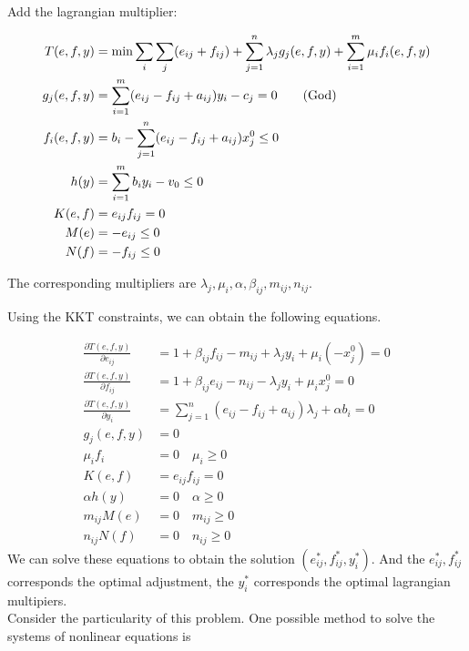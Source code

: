 \documentclass[UTF8]{article}
\begin{document}
Add the lagrangian multiplier:

\begin{align}
  T(e,f,y) &= \min \sum_i\sum_j(e_{ij}+f_{ij}) + \sum_{j=1}^n \lambda_j
  g_j(e,f,y) + \sum_{i=1}^m \mu_i f_i(e,f,y)\nonumber\\
  g_j(e,f,y) &= \sum_{i=1}^m (e_{ij}-f_{ij}+a_{ij})y_i-c_j = 0 \tag{\text{God}} \\
  f_i(e,f,y) &= b_i - \sum_{j=1}^n (e_{ij}-f_{ij}+a_{ij})x_j^0 \leq 0 \\
  h(y) &= \sum_{i=1}^m b_i y_i - v_0 \leq 0\\
  K(e,f) &= e_{ij}f_{ij}=0  \\
  M(e) &= -e_{ij} \leq 0 \label{M}  \\
  N(f) &= -f_{ij} \leq 0
\end{align}

The corresponding multipliers are $\lambda_j, \mu_i, \alpha, \beta_{ij}, m_{ij}, n_{ij}$.

Using the KKT constraints, we can obtain the following equations.

\begin{align*}
  \frac{\partial T(e,f,y)}{\partial e_{ij}} &= 1+ \beta_{ij} f_{ij} - m_{ij}+\lambda_j y_i + \mu_i(-x_j^0) = 0  \\
  \frac{\partial T(e,f,y)}{\partial f_{ij}} &= 1+ \beta_{ij} e_{ij} - n_{ij}-\lambda_j y_i + \mu_i x_j^0 = 0   \\
  \frac{\partial T(e,f,y)}{\partial y_{i}} &=\sum_{j=1}^n(e_{ij}-f_{ij}+a_{ij})\lambda_j + \alpha b_i = 0 \\
  g_j(e,f,y) &=0 \\
  \mu_i f_i &= 0 \quad \mu_i \geq 0 \\
  K(e,f) &= e_{ij}f_{ij} =0 \\
  \alpha h(y) &=0 \quad \alpha \geq 0\\
  m_{ij} M(e) &=0 \quad m_{ij} \geq 0 \\
  n_{ij} N(f) &=0 \quad n_{ij} \geq 0
\end{align*}
We can solve these equations to obtain the solution $(e_{ij}^*, f_{ij}^*, y_i^*)$. And the $e_{ij}^*, f_{ij}^*$ corresponds the optimal adjustment, the $y_i^*$ corresponds the optimal lagrangian multipiers. \\
Consider the particularity of this problem.
One possible method to solve the systems of nonlinear equations is
\end{document}

